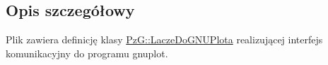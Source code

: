 \subsection{Opis szczegółowy}
Plik zawiera definicję klasy \mbox{\hyperlink{class_pz_g_1_1_lacze_do_g_n_u_plota}{Pz\+G\+::\+Lacze\+Do\+G\+N\+U\+Plota}} realizującej interfejs komunikacyjny do programu gnuplot. 
